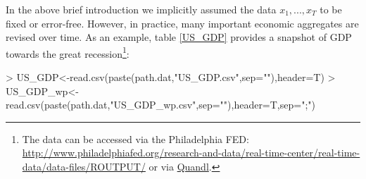 \documentclass[a4paper]{book}
\begin{document}
In the above brief introduction we implicitly assumed the data $x_1,...,x_T$ to be fixed or error-free. However, in practice, many important economic aggregates are revised over time. As an example, table \ref{US_GDP} provides a snapshot of GDP towards the great recession\footnote{The data can be accessed
via the Philadelphia FED: \url{http://www.philadelphiafed.org/research-and-data/real-time-center/real-time-data/data-files/ROUTPUT/} or via \href{https://www.quandl.com}{Quandl}.}:
\begin{Schunk}
\begin{Sinput}
> US_GDP<-read.csv(paste(path.dat,"US_GDP.csv",sep=""),header=T)
> US_GDP_wp<-read.csv(paste(path.dat,"US_GDP_wp.csv",sep=""),header=T,sep=";")
\end{Sinput}
\end{Schunk}
\end{document}
